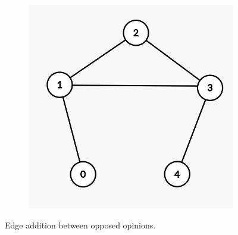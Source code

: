 \begin{figure}[t]
\begin{subfigure}[t]{0.3\textwidth}
		\includegraphics[height=0.15\textheight]{Figures/p5B}
		\caption{}
		\label{subfig:monotonicityB}
	\end{subfigure}
	\hfill
	\caption{Edge addition between opposed opinions.}
	\label{fig:p5}
\end{figure}

